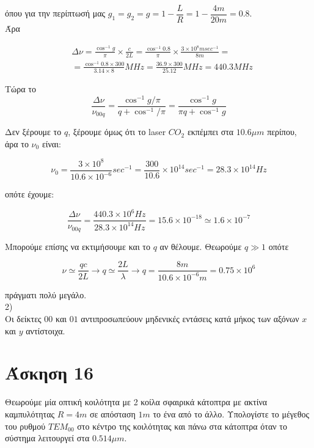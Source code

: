 \documentclass[a4paper,11pt,titlepage]{article}
\numberwithin{equation}{section} %
\begin{document}
όπου για την περίπτωσή μας $g_1=g_2=g=1-\dfrac{L}{R}=1-\dfrac{4m}{20m}=0.8$.\\
Άρα

\begin{equation}
\begin{split}
& \Delta \nu=\frac{\cos^{-1}g}{\pi}\times\frac{c}{2L}=\frac{\cos^{-1}0.8}{\pi}\times\frac{3\times10^8msec^{-1}}{8m}= \\
& =\frac{\cos^{-1}0.8\times300}{3.14\times8}MHz=\frac{36.9\times300}{25.12}MHz=440.3MHz
\end{split}
\end{equation}

Τώρα το 
\begin{equation}
 \dfrac{\Delta \nu}{\nu_{00q}}=\dfrac{\cos^{-1}g/\pi}{q+\cos^{-1}/\pi}=\dfrac{\cos^{-1}g}{\pi q+\cos^{-1}g}
\end{equation}

Δεν ξέρουμε το $q$, ξέρουμε όμως ότι το laser $CO_2$ εκπέμπει στα $10.6\mu m$ περίπου, άρα το $\nu_0$ είναι:

\begin{equation}
 \nu_0=\frac{3\times10^8}{10.6\times10^{-6}}sec^{-1}=\frac{300}{10.6}\times10^{14}sec^{-1}=28.3\times10^{14}Hz
\end{equation}

οπότε έχουμε:

\begin{equation}
  \dfrac{\Delta\nu}{\nu_{00q}}=\frac{440.3\times10^6 Hz}{28.3\times10^{14}Hz}=15.6\times10^{-18}\simeq1.6\times10^{-7}
\end{equation}

Μπορούμε επίσης να εκτιμήσουμε και το $q$ αν θέλουμε. Θεωρούμε $q\gg1$ οπότε 

\begin{equation}
\nu\simeq \dfrac{qc}{2L}\longrightarrow q\simeq \dfrac{2L}{\lambda}\longrightarrow q=\dfrac{8m}{10.6\times10^{-6}m}=0.75\times10^6
\end{equation}

πράγματι πολύ μεγάλο.
\\[0.5cm]
2)
\\[0.3cm]
Οι δείκτες $00$ και $01$ αντιπροσωπεύουν μηδενικές εντάσεις κατά μήκος των αξόνων $x$ και $y$ αντίστοιχα.

\newpage
\section{Άσκηση 16}

Θεωρούμε μία οπτική κοιλότητα με 2 κοίλα σφαιρικά κάτοπτρα με ακτίνα καμπυλότητας $R=4m$ σε απόσταση $1m$ το ένα από το άλλο. Υπολογίστε το μέγεθος του ρυθμού $TEM_{00}$ στο κέντρο της κοιλότητας και πάνω στα κάτοπτρα όταν το σύστημα λειτουργεί στα $0.514\mu m$.
\end{document}

